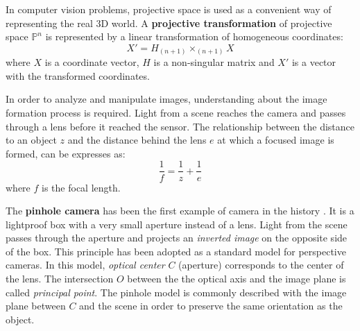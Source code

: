 In computer vision problems, projective space is used as a convenient way of representing the real 3D world.
A \textbf{projective transformation} of projective space $\mathds{P}^n$ is represented by a linear transformation of homogeneous coordinates:
\begin{equation}
X' = H_{(n+1)} \times _{(n+1)}X
\end{equation}
where $X$ is a coordinate vector, $H$ is a non-singular matrix and $X'$ is a vector with the transformed coordinates.

In order to analyze and manipulate images, understanding about the image formation process is required.
Light from a scene reaches the camera and passes through a lens before it reached the sensor.
The relationship between the distance to an object $z$ and the distance behind the lens $e$ at which a focused image is formed, can be expresses as:
\begin{equation}
\label{eq:optics}
\frac{1}{f} = \frac{1}{z} + \frac{1}{e}
\end{equation}
where $f$ is the focal length.

The \textbf{pinhole camera} has been the first example of camera in the history \cite{gernsheim1969history}.
It is a lightproof box with a very small aperture instead of a lens.
Light from the scene passes through the aperture and projects an \textit{inverted image} on the opposite side of the box.
This principle has been adopted as a standard model for perspective cameras.
In this model, \textit{optical center} $C$ (aperture) corresponds to the center of the lens.
The intersection $O$ between the the optical axis and the image plane is called \textit{principal point}.
The pinhole model is commonly described with the image plane between $C$ and the scene in order to preserve the same orientation as the object.

